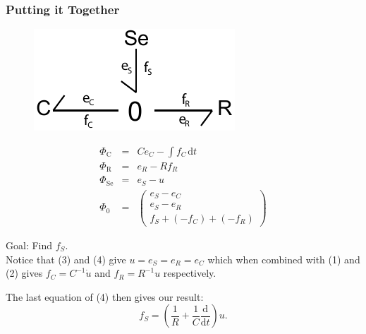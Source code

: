 \documentclass[11pt,reqno]{beamer}
\newcommand{\D}[2]{\frac{\mathrm{d} #1}{\mathrm{d} #2}}
\newcommand{\df}[1]{\mspace{2mu}  \mathrm{d}#1}
\begin{document}
\begin{frame}
\frametitle{Putting it Together}
\begin{small}
\begin{minipage}{0.4\textwidth}
\begin{figure}
	\includegraphics[width=\textwidth]{RC_bondgraph.pdf}
\end{figure}
\end{minipage}
\begin{minipage}{0.57\textwidth}
\begin{eqnarray}
\Phi_\text{C} &=& Ce_C - \int f_C \df{t}\\
\Phi_\text{R} &=& e_R - Rf_R\\
\Phi_\text{Se} & =& e_S - u\\
\Phi_\text{0} &=&
\left(\begin{matrix}
e_S  - e_C\\
e_S - e_R\\
f_S  + (- f_C) +  (-f_R)
\end{matrix}\right)
\end{eqnarray}
\end{minipage}
Goal: Find $f_S$.\\
Notice that (3) and (4) give $u = e_S =e_R = e_C$ which when combined with (1) and (2) gives $f_C = C^{-1}\dot{u}$ and $f_R = R^{-1}u$ respectively.\\
\vspace{5pt}

The last equation of (4) then gives our result:
\[
f_S = \left(\frac{1}{R} + \frac{1}{C}\D{}{t}\right)u.
\]
\end{small}
\end{frame}
\end{document}
